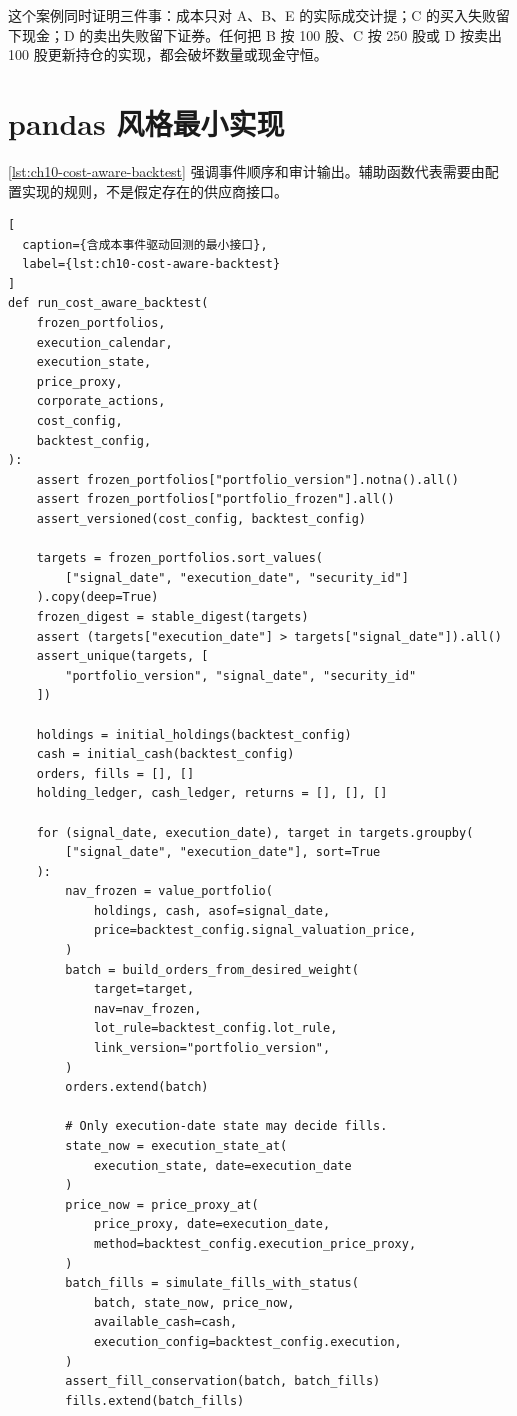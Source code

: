 这个案例同时证明三件事：成本只对 A、B、E 的实际成交计提；C 的买入失败留下现金；D 的卖出失败留下证券。任何把 B 按 100 股、C 按 250 股或 D 按卖出 100 股更新持仓的实现，都会破坏数量或现金守恒。

\section{pandas 风格最小实现}

\cref{lst:ch10-cost-aware-backtest} 强调事件顺序和审计输出。辅助函数代表需要由配置实现的规则，不是假定存在的供应商接口。

\begin{lstlisting}[
  caption={含成本事件驱动回测的最小接口},
  label={lst:ch10-cost-aware-backtest}
]
def run_cost_aware_backtest(
    frozen_portfolios,
    execution_calendar,
    execution_state,
    price_proxy,
    corporate_actions,
    cost_config,
    backtest_config,
):
    assert frozen_portfolios["portfolio_version"].notna().all()
    assert frozen_portfolios["portfolio_frozen"].all()
    assert_versioned(cost_config, backtest_config)

    targets = frozen_portfolios.sort_values(
        ["signal_date", "execution_date", "security_id"]
    ).copy(deep=True)
    frozen_digest = stable_digest(targets)
    assert (targets["execution_date"] > targets["signal_date"]).all()
    assert_unique(targets, [
        "portfolio_version", "signal_date", "security_id"
    ])

    holdings = initial_holdings(backtest_config)
    cash = initial_cash(backtest_config)
    orders, fills = [], []
    holding_ledger, cash_ledger, returns = [], [], []

    for (signal_date, execution_date), target in targets.groupby(
        ["signal_date", "execution_date"], sort=True
    ):
        nav_frozen = value_portfolio(
            holdings, cash, asof=signal_date,
            price=backtest_config.signal_valuation_price,
        )
        batch = build_orders_from_desired_weight(
            target=target,
            nav=nav_frozen,
            lot_rule=backtest_config.lot_rule,
            link_version="portfolio_version",
        )
        orders.extend(batch)

        # Only execution-date state may decide fills.
        state_now = execution_state_at(
            execution_state, date=execution_date
        )
        price_now = price_proxy_at(
            price_proxy, date=execution_date,
            method=backtest_config.execution_price_proxy,
        )
        batch_fills = simulate_fills_with_status(
            batch, state_now, price_now,
            available_cash=cash,
            execution_config=backtest_config.execution,
        )
        assert_fill_conservation(batch, batch_fills)
        fills.extend(batch_fills)


\end{lstlisting}
